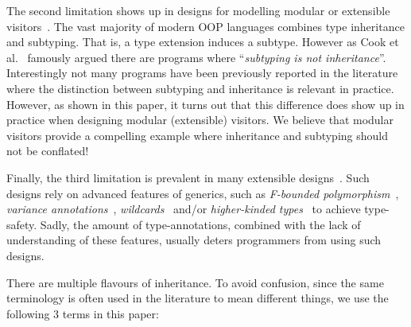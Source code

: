 The second limitation shows up in designs for modelling
modular or extensible visitors~\cite{togersen:2004,oliveira09modular}.  The vast majority of modern
OOP languages combines type inheritance and subtyping. 
That is, a type extension induces a subtype. However
as Cook et al.~\cite{cook1989inheritance} famously argued there are programs where
``\emph{subtyping is not inheritance}''. Interestingly 
not many programs have been previously reported in the literature
where the distinction between subtyping and inheritance is
relevant in practice. However, as shown in this paper, it turns out that this
difference does show up in practice when designing modular
(extensible) visitors.  We believe that modular visitors provide a
compelling example where inheritance and subtyping should
not be conflated!

Finally, the third limitation is prevalent in many extensible
designs~\cite{togersen:2004,Zenger-Odersky2005,oliveira09modular,oliveira2013feature,rendel14attributes}.
Such designs rely on advanced features of generics,
such as \emph{F-bounded polymorphism}~\cite{Canning89f-bounded}, \emph{variance
annotations}~\cite{Igarashi06variant}, \emph{wildcards}~\cite{Torgersen04wildcards} and/or \emph{higher-kinded
types}~\cite{Moors08generics} to achieve type-safety. Sadly, the amount of
type-annotations, combined with the lack of understanding of these
features, usually deters programmers from using such designs.





There are multiple flavours of inheritance. To avoid confusion, since 
the same terminology is often used in the literature to mean different 
things, we use the following 3 terms in this paper:

